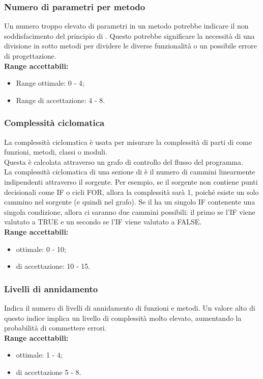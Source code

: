 \documentclass{scalatekids-article}
\begin{document}
\subsubsection{Numero di parametri per metodo}
Un numero troppo elevato di parametri in un metodo potrebbe indicare il non soddisfacimento del principio di \textit{}. Questo potrebbe significare la necessità di una divisione in sotto metodi per dividere le diverse funzionalità o un possibile errore di progettazione.\\
\textbf{Range accettabili:}
\begin{itemize}
  \item Range ottimale: 0 - 4;
  \item Range di accettazione: 4 - 8.
\end{itemize}
\subsubsection{Complessità ciclomatica}
La complessità ciclomatica è usata per misurare la complessità di parti di  come funzioni, metodi, classi o moduli.\\
Questa è calcolata attraverso un grafo di controllo del flusso del programma.\\La complessità ciclomatica di una sezione di  è il numero di cammini linearmente indipendenti attraverso il  sorgente. Per esempio, se il  sorgente non contiene punti decisionali come IF o cicli FOR, allora la complessità sarà 1, poiché esiste un solo cammino nel sorgente (e quindi nel grafo). Se il  ha un singolo IF contenente una singola condizione, allora ci saranno due cammini possibili: il primo se l'IF viene valutato a TRUE e un secondo se l'IF viene valutato a FALSE.\\
\textbf{Range accettabili:}
\begin{itemize}
  \item {} ottimale: 0 - 10;
  \item {} di accettazione: 10 - 15.
\end{itemize}
\subsubsection{Livelli di annidamento}
Indica il numero di livelli di annidamento di funzioni e metodi. Un valore alto di questo indice implica un livello di complessità molto elevato, aumentando la probabilità di commettere errori.\\
\textbf{Range accettabili:}
\begin{itemize}
  \item {} ottimale: 1 - 4;
  \item {} di accettazione 5 - 8.
\end{itemize}
\newpage
\appendix
\end{document}
